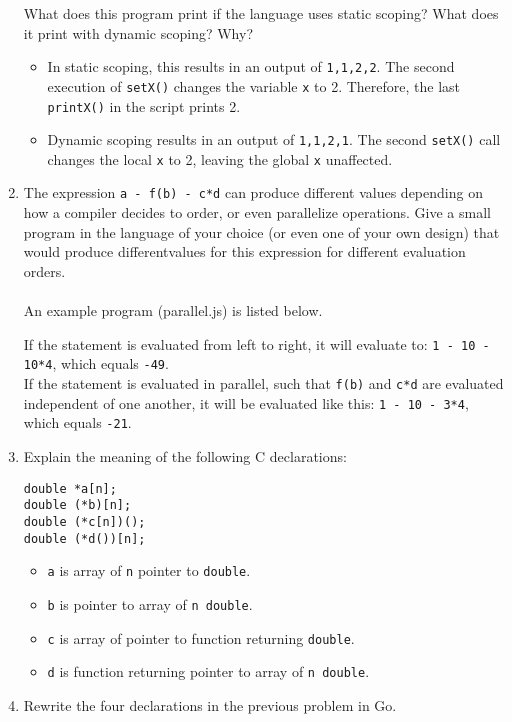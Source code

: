 \documentclass{article}
\begin{document}
\begin{enumerate}
What does this program print if the language uses static scoping? What does it print with dynamic scoping? Why? \\
\begin{itemize}
\item In static scoping, this results in an output of \texttt{1,1,2,2}. The second execution of \texttt{setX()} changes the variable \texttt{x} to 2. Therefore, the last \texttt{printX()} in the script prints 2. 
\item Dynamic scoping results in an output of \texttt{1,1,2,1}. The second \texttt{setX()} call changes the local \texttt{x} to 2, leaving the global \texttt{x} unaffected.
\end{itemize}
\pagebreak
\item The expression \texttt{a - f(b) - c*d} can produce different values depending on how a compiler decides to order, or even parallelize operations.  Give a small program in the language of your choice (or even one of your own design) that would produce differentvalues for this expression for different evaluation orders. \\\\
An example program (parallel.js) is listed below.

If the statement is evaluated from left to right, it will evaluate to: \texttt{1 - 10 - 10*4}, which equals \texttt{-49}. \\
If the statement is evaluated in parallel, such that \texttt{f(b)} and \texttt{c*d} are evaluated independent of one another,  it will be evaluated like this: \texttt{1 - 10 - 3*4}, which equals \texttt{-21}.
\pagebreak
\item Explain the meaning of the following C declarations:
\begin{verbatim}
double *a[n];  
double (*b)[n];
double (*c[n])();
double (*d())[n];
\end{verbatim}
\begin{itemize}
    \item \texttt{a} is array of \texttt{n} pointer to \texttt{double}.
    \item \texttt{b} is pointer to array of \texttt{n double}.
    \item \texttt{c} is array of pointer to function returning \texttt{double}.
    \item \texttt{d} is function returning pointer to array of \texttt{n double}.
\end{itemize}
\pagebreak
\item Rewrite the four declarations in the previous problem in Go.

\end{enumerate}
\end{document}
